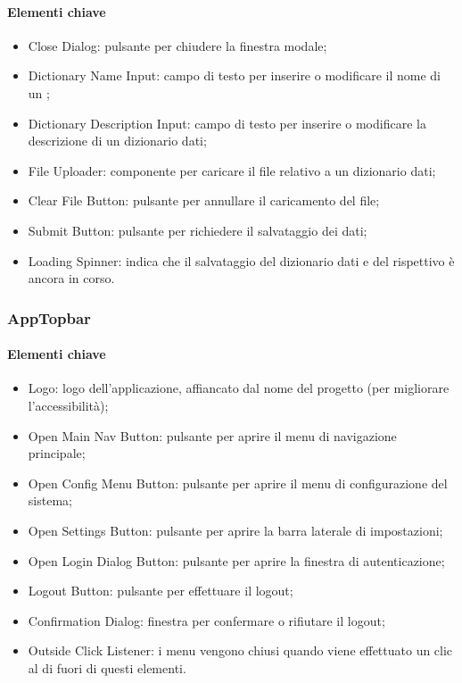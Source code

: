 \paragraph*{Elementi chiave}
\begin{itemize}
  \item Close Dialog: pulsante per chiudere la finestra modale;
  \item Dictionary Name Input: campo di testo per inserire o modificare il nome di un ;
  \item Dictionary Description Input: campo di testo per inserire o modificare la descrizione di un dizionario dati;
  \item File Uploader: componente per caricare il file relativo a un dizionario dati;
  \item Clear File Button: pulsante per annullare il caricamento del file;
  \item Submit Button: pulsante per richiedere il salvataggio dei dati;
  \item Loading Spinner: indica che il salvataggio del dizionario dati e del rispettivo  è ancora in corso.
\end{itemize}

\subsubsection{AppTopbar}

\paragraph*{Elementi chiave}
\begin{itemize}
  \item Logo: logo dell'applicazione, affiancato dal nome del progetto (per migliorare l'accessibilità);
  \item Open Main Nav Button: pulsante per aprire il menu di navigazione principale;
  \item Open Config Menu Button: pulsante per aprire il menu di configurazione del sistema;
  \item Open Settings Button: pulsante per aprire la barra laterale di impostazioni;
  \item Open Login Dialog Button: pulsante per aprire la finestra di autenticazione;
  \item Logout Button: pulsante per effettuare il logout;
  \item Confirmation Dialog: finestra per confermare o rifiutare il logout;
  \item Outside Click Listener: i menu vengono chiusi quando viene effettuato un clic al di fuori di questi elementi.
\end{itemize}

